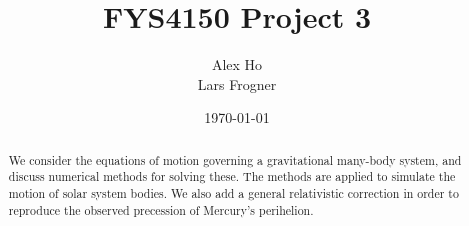 \documentclass{article}
\begin{document}
\title{\bfseries FYS4150 Project 3}
\author{Alex Ho\\Lars Frogner}
\date{\today}
\maketitle

\begin{abstract}
    We consider the equations of motion governing a gravitational many-body system, and discuss numerical methods for solving these. The methods are applied to simulate the motion of solar system bodies. We also add a general relativistic correction in order to reproduce the observed precession of Mercury's perihelion.
\end{abstract}

\tableofcontents
\newpage
{}
\end{document}
